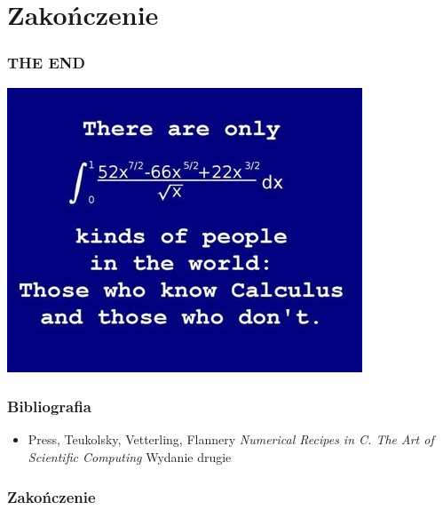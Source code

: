 \documentclass[compress,red]{beamer}
\begin{document}
\section{Zakończenie}
	\begin{frame}
		\frametitle{THE END}
		\includegraphics[scale=0.7]{./img/calculus}
	\end{frame}
	
	\begin{frame}
		\frametitle{Bibliografia}
		\begin{itemize}
			\item Press, Teukolsky, Vetterling, Flannery
			\textit{Numerical Recipes in C. The Art of Scientific Computing}
			Wydanie drugie
		\end{itemize}
	\end{frame}	
	
	\begin{frame}
		\frametitle{Zakończenie}
	\end{frame}
\end{document}
